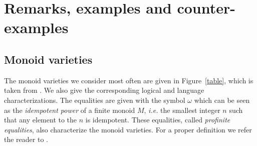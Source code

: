\documentclass[12pt]{report}
\theoremstyle{definition}
\theoremstyle{remark}
\begin{document}
\begin{comment}
\end{tikzpicture}
\caption{Transducer $T$.}
        \end{subfigure}
        ~
        \begin{subfigure}[b]{0.4\textwidth}
\centering
\begin{tikzpicture}
\node[rectangle,draw, fill=white] (0) at (0,0) {$0,\varepsilon$} ;
\node[rectangle,draw, fill=white] (12) at (2.5,0) {$\begin{array}{c}1,a\\ 2,\varepsilon\end{array}$} ;
\node[rectangle,draw, fill=white] (1) at (5,0) {$1,\varepsilon$} ;
\draw[thick,->,>=stealth] (-1.1,0) --(0);
\draw[thick,->,>=stealth] (12) --(2.5,1.3);
\draw[thick,->,>=stealth] (0)--(12) node[midway,above,sloped] {$a\mid a$};
\draw[thick,->,>=stealth] (12)to[bend left](1);
\node at (3.75,0.8) {$b\mid aa$};
\node at (3.75,-0.8) {$a\mid \varepsilon$};
\draw[thick,->,>=stealth] (1)to[bend left](12);

\draw[thick] (12) to[out=-65,in=0](2.5,-1.3) node[below] {$a\mid a$};
\draw[thick,->,>=stealth] (2.5,-1.3) to[out=180,in=-115](12);
\draw[thick] (1) to[out=35,in=90](6.1,0) node[right] {$b\mid a$};
\draw[thick,->,>=stealth] (6.1,0) to[out=-90,in=-35](1);

\end{tikzpicture}
\caption{Determinized transducer.}
        \end{subfigure}
        \caption{}
        \label{fig-v-algo}
\end{figure}

\end{xmp}
\end{comment}


\chapter{Remarks, examples and counter-examples}


\section{Monoid varieties}
The monoid varieties we consider most often are given in Figure~\ref{table},
 which is taken from \cite{dartois15}. We also give the corresponding logical and language characterizations.
The equalities are given with the symbol $\omega$ which can be seen as the \emph{idempotent power} of a finite monoid $M$, \emph{i.e.} the smallest integer $n$ such that any element to the $n$ is idempotent.
These equalities, called \emph{profinite equalities}, also characterize the monoid varieties. For a proper definition we refer the reader to \cite{pin97}.
\end{document}
